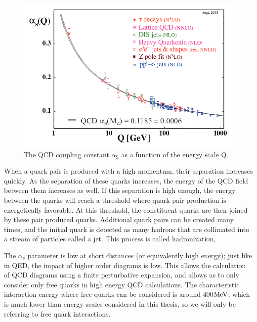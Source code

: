 \begin{figure}
\begin{center}
\includegraphics[width=1.0\linewidth]{figs/alphasrunning.png}
\caption{The QCD coupling constant $\alpha_{\mathrm{S}}$ as a function of the energy scale Q.}
\label{figs:alphasrunning}
\end{center}
\end{figure}


When a quark pair is produced with a high momentum, their separation increases quickly.  
As the separation of these quarks increases, the energy of the QCD field between them increases as well.  
If this separation is high enough, the energy between the quarks will reach a threshold where quark pair production is energetically favorable.  
At this threshold, the constituent quarks are then joined by these pair produced quarks.  
Additional quark pairs can be created many times, and the initial quark is detected as many hadrons that are collimated into a stream of particles called a jet.  
This process is called hadronization, 

The $\alpha_s$ parameter is low at short distances (or equivalently high energy); 
just like in QED, the impact of higher order diagrams is low.  
This allows the calculation of QCD diagrams using a finite perturbative expansion, and allows us to only consider only free quarks in high energy QCD calculations. 
The characteristic interaction energy where free quarks can be considered is around 400$\mathrm{MeV}$, which is much lower than energy scales 
considered in this thesis, so we will only be referring to free quark interactions.  


